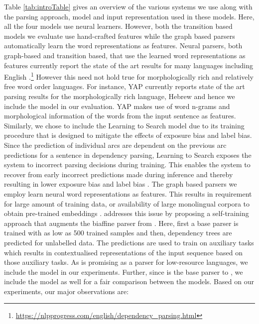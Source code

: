 \documentclass[11pt]{article}
\begin{document}
Table \ref{tab:introTable} gives an overview of the various systems we use along with the parsing approach, model and input representation used in these models.  Here, all the four models use neural learners. However, both the transition based models we evaluate use hand-crafted features while the graph based parsers automatically learn the word representations as features. Neural parsers, both graph-based and transition based, that use the learned word representations as features currently report the state of the art results for many languages including English \cite{mrini2019rethinking,qi-etal-2018-universal}.\footnote{\url{https://nlpprogress.com/english/dependency_parsing.html}}  However this need not hold true for morphologically rich and relatively free word order languages. For instance, YAP \cite{more-etal-2019-joint}
 currently reports state of the art parsing results for the morphologically rich language, Hebrew and hence we include the model in our evaluation. YAP makes use of word n-grams and morphological information of the words from the input sentence as features. Similarly, we chose to include the Learning to Search model due to its training procedure that is designed to mitigate the effects of exposure bias and label bias.  Since the prediction of individual arcs are dependent on the previous arc predictions for a sentence   in dependency parsing, Learning to Search \cite{credit_asg} exposes the system to incorrect parsing decisions during training. This enables the system to recover from early incorrect predictions made during inference and thereby resulting in lower exposure bias and label bias \cite{wiseman-rush-2016-sequence}. The graph based parsers we employ learn neural word representations as features. This results in requirement for large amount of training data, or availability of large monolingual corpora to obtain pre-trained embeddings \cite{che-etal-2018-towards}.  addresses this issue by proposing a self-training approach that augments the biaffine parser from . Here, first a base parser is trained with as low as 500 trained samples and then, dependency trees are predicted for unlabelled data. The predictions are used to train on auxiliary tasks which results in contextualised representations of the input sequence based on those auxiliary tasks. As  is promising as a parser for low-resource languages, we include the model in our experiments. Further, since  is the base parser to , we include the model  as well for a fair comparison between the models.  Based on our experiments, our major observations are:
 
\end{document}
